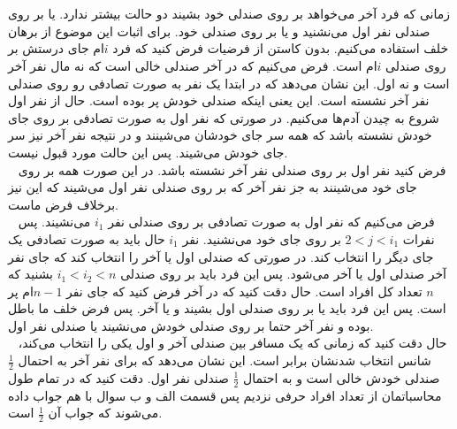 \\\\
زمانی که فرد آخر می‌خواهد بر روی صندلی خود بشیند دو حالت بیشتر ندارد. یا بر روی صندلی نفر اول
می‌نشنید و یا بر روی صندلی خود.
برای اثبات این موضوع از برهان خلف استفاده می‌کنیم. بدون کاستن از فرضیات فرض کنید که فرد
$i$ام
جای درستش بر روی صندلی
$i$ام
است.
 فرض می‌کنیم که در آخر صندلی خالی است که نه مال نفر آخر است و نه اول.
این نشان می‌دهد که در ابتدا یک نفر به صورت تصادفی رو روی صندلی نفر آخر نشسته است. این یعنی اینکه صندلی خودش
پر بوده است.
حال از نفر اول شروع به چیدن آدم‌ها می‌کنیم.
در صورتی که نفر اول به صورت تصادفی بر روی جای خودش نشسته باشد که همه سر جای خودشان می‌شینند و در نتیجه
نفر آخر نیز سر جای خودش می‌شیند. پس این حالت مورد قبول نیست.
\\~
فرض کنید نفر اول بر روی صندلی نفر آخر نشسته باشد. در این صورت همه بر روی جای خود می‌شینند به جز نفر آخر
که بر روی صندلی نفر اول می‌شیند که این نیز برخلاف فرض ماست.
\\~
فرض می‌کنیم که نفر اول به صورت تصادفی بر روی صندلی نفر
$i_1$
می‌نشیند.
پس نفرات
$2 < j < i_1$
بر روی جای خود می‌نشنید.
نفر
$i_1$
حال باید به صورت تصادفی یک جای دیگر را انتخاب کند. در صورتی که صندلی اول یا آخر را انتخاب کند که جای
نفر آخر صندلی اول یا آخر می‌شود. پس این فرد باید بر روی صندلی
$i_1 < i_2 < n$
بشنید که 
$n$
تعداد کل افراد است.
حال دقت کنید که در آخر فرض کنید که جای نفر
$n-1$ام
پر است. پس این فرد باید یا بر روی صندلی اول بشیند و یا آخر.
پس فرض خلف ما باطل بوده و نفر آخر حتما بر روی صندلی خودش می‌نشیند یا صندلی نفر اول.
\\~
حال دقت کنید که زمانی که یک مسافر بین صندلی آخر و اول یکی را انتخاب می‌کند، شانس انتخاب شدنشان برابر است.
این نشان می‌دهد که برای نفر آخر به احتمال
$\frac{1}{2}$
صندلی خودش خالی است و به احتمال
$\frac{1}{2}$
صندلی نفر اول. دقت کنید که در تمام طول محاسباتمان از تعداد افراد حرفی نزدیم پس قسمت الف و ب سوال با هم
جواب داده می‌شوند که جواب آن
$\frac{1}{2}$
است.
\\